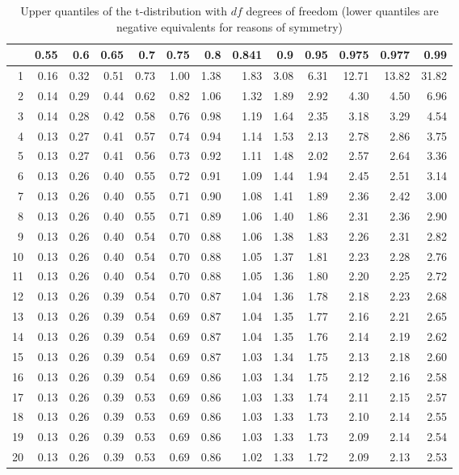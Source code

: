\begin{table}[ht]
\centering
\begin{tabular}{rrrrrrrrrrrrr}
  \hline
 & 0.55 & 0.6 & 0.65 & 0.7 & 0.75 & 0.8 & 0.841 & 0.9 & 0.95 & 0.975 & 0.977 & 0.99 \\ 
  \hline
  1 & 0.16 & 0.32 & 0.51 & 0.73 & 1.00 & 1.38 & 1.83 & 3.08 & 6.31 & 12.71 & 13.82 & 31.82 \\ 
  2 & 0.14 & 0.29 & 0.44 & 0.62 & 0.82 & 1.06 & 1.32 & 1.89 & 2.92 & 4.30 & 4.50 & 6.96 \\ 
  3 & 0.14 & 0.28 & 0.42 & 0.58 & 0.76 & 0.98 & 1.19 & 1.64 & 2.35 & 3.18 & 3.29 & 4.54 \\ 
  4 & 0.13 & 0.27 & 0.41 & 0.57 & 0.74 & 0.94 & 1.14 & 1.53 & 2.13 & 2.78 & 2.86 & 3.75 \\ 
  5 & 0.13 & 0.27 & 0.41 & 0.56 & 0.73 & 0.92 & 1.11 & 1.48 & 2.02 & 2.57 & 2.64 & 3.36 \\ 
  6 & 0.13 & 0.26 & 0.40 & 0.55 & 0.72 & 0.91 & 1.09 & 1.44 & 1.94 & 2.45 & 2.51 & 3.14 \\ 
  7 & 0.13 & 0.26 & 0.40 & 0.55 & 0.71 & 0.90 & 1.08 & 1.41 & 1.89 & 2.36 & 2.42 & 3.00 \\ 
  8 & 0.13 & 0.26 & 0.40 & 0.55 & 0.71 & 0.89 & 1.06 & 1.40 & 1.86 & 2.31 & 2.36 & 2.90 \\ 
  9 & 0.13 & 0.26 & 0.40 & 0.54 & 0.70 & 0.88 & 1.06 & 1.38 & 1.83 & 2.26 & 2.31 & 2.82 \\ 
  10 & 0.13 & 0.26 & 0.40 & 0.54 & 0.70 & 0.88 & 1.05 & 1.37 & 1.81 & 2.23 & 2.28 & 2.76 \\ 
  11 & 0.13 & 0.26 & 0.40 & 0.54 & 0.70 & 0.88 & 1.05 & 1.36 & 1.80 & 2.20 & 2.25 & 2.72 \\ 
  12 & 0.13 & 0.26 & 0.39 & 0.54 & 0.70 & 0.87 & 1.04 & 1.36 & 1.78 & 2.18 & 2.23 & 2.68 \\ 
  13 & 0.13 & 0.26 & 0.39 & 0.54 & 0.69 & 0.87 & 1.04 & 1.35 & 1.77 & 2.16 & 2.21 & 2.65 \\ 
  14 & 0.13 & 0.26 & 0.39 & 0.54 & 0.69 & 0.87 & 1.04 & 1.35 & 1.76 & 2.14 & 2.19 & 2.62 \\ 
  15 & 0.13 & 0.26 & 0.39 & 0.54 & 0.69 & 0.87 & 1.03 & 1.34 & 1.75 & 2.13 & 2.18 & 2.60 \\ 
  16 & 0.13 & 0.26 & 0.39 & 0.54 & 0.69 & 0.86 & 1.03 & 1.34 & 1.75 & 2.12 & 2.16 & 2.58 \\ 
  17 & 0.13 & 0.26 & 0.39 & 0.53 & 0.69 & 0.86 & 1.03 & 1.33 & 1.74 & 2.11 & 2.15 & 2.57 \\ 
  18 & 0.13 & 0.26 & 0.39 & 0.53 & 0.69 & 0.86 & 1.03 & 1.33 & 1.73 & 2.10 & 2.14 & 2.55 \\ 
  19 & 0.13 & 0.26 & 0.39 & 0.53 & 0.69 & 0.86 & 1.03 & 1.33 & 1.73 & 2.09 & 2.14 & 2.54 \\ 
  20 & 0.13 & 0.26 & 0.39 & 0.53 & 0.69 & 0.86 & 1.02 & 1.33 & 1.72 & 2.09 & 2.13 & 2.53 \\ 
   \hline
\end{tabular}
\caption{Upper quantiles of the t-distribution with $df$ degrees of freedom (lower quantiles are negative equivalents for reasons of symmetry)} 
\end{table}
